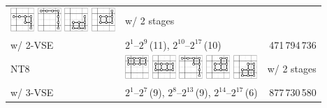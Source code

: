 \documentclass[runningheads]{llncs}
\begin{document}
\begin{tabular}{ll@{~~}r}
\includegraphics[width=0.9cm]{figures/NTuple-74.pdf}
\includegraphics[width=0.9cm]{figures/NTuple-75.pdf}
\includegraphics[width=0.9cm]{figures/NTuple-76.pdf}
\includegraphics[width=0.9cm]{figures/NTuple-77.pdf}
& w/ 2 stages \\
w/ 2-VSE & \phantom{\rule{1pt}{9.5pt}} $2^1$--$2^{9}$\,(11), $2^{10}$--$2^{17}$\,(10)   &  471\,794\,736  \\\hline
\textsf{NT8}
&
\includegraphics[width=0.9cm]{figures/NTuple-80.pdf}
\includegraphics[width=0.9cm]{figures/NTuple-81.pdf}
\includegraphics[width=0.9cm]{figures/NTuple-82.pdf}
\includegraphics[width=0.9cm]{figures/NTuple-83.pdf}
\includegraphics[width=0.9cm]{figures/NTuple-84.pdf}
& w/ 2 stages \\
w/ 3-VSE & \phantom{\rule{1pt}{9.5pt}} $2^1$--$2^{7}$\,(9), $2^{8}$--$2^{13}$\,(9), $2^{14}$--$2^{17}$\,(6) & 877\,730\,580 \\\hline

\end{tabular}
\end{document}
